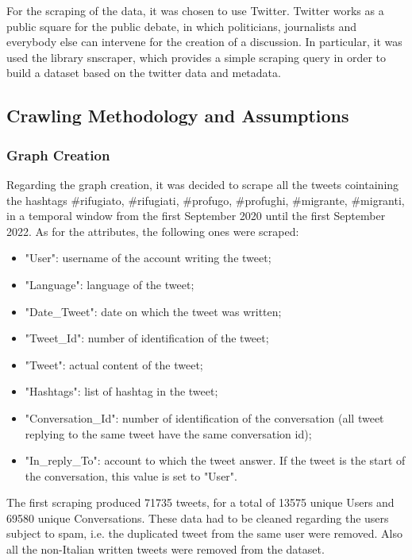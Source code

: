 \documentclass[sigchi]{acmart}
\begin{document}
For the scraping of the data, it was chosen to use Twitter.
Twitter works as a public square for the public debate, in which politicians, journalists and everybody else can intervene for the creation of a discussion.
In particular, it was used the library snscraper\cite{snscraper}, which provides a simple scraping query in order to build a dataset based on the twitter data and metadata. 

\subsection{Crawling Methodology and Assumptions}

\subsubsection{Graph Creation}
Regarding the graph creation, it was decided to scrape all the tweets cointaining the hashtags \#rifugiato, \#rifugiati, \#profugo, \#profughi, \#migrante, \#migranti, in a temporal window from the first September 2020 until the first September 2022. As for the attributes, the following ones were scraped:
\begin{itemize}
    \item "User": username of the account writing the tweet;
    \item "Language": language of the tweet;
    \item "Date\_Tweet": date on which the tweet was written;
    \item "Tweet\_Id": number of identification of the tweet;
    \item "Tweet": actual content of the tweet;
    \item "Hashtags": list of hashtag in the tweet;
    \item "Conversation\_Id": number of identification of the conversation (all tweet replying to the same tweet have the same conversation id);
    \item "In\_reply\_To": account to which the tweet answer. If the tweet is the start of the conversation, this value is set to "User".
\end{itemize}

The first scraping produced 71735 tweets, for a total of 13575 unique Users and 69580 unique Conversations. These data had to be cleaned regarding the users subject to spam, i.e. the duplicated tweet from the same user were removed.
Also all the non-Italian written tweets were removed from the dataset.
\end{document}
